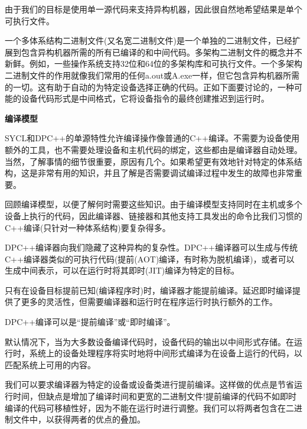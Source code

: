 由于我们的目标是使用单一源代码来支持异构机器，因此很自然地希望结果是单个可执行文件。\par

一个多体系结构二进制文件(又名宽二进制文件)是一个单独的二进制文件，已经扩展到包含异构机器所需的所有已编译的和中间代码。多架构二进制文件的概念并不新鲜。例如，一些操作系统支持32位和64位的多架构库和可执行文件。一个多架构二进制文件的作用就像我们常用的任何a.out或A.exe一样，但它包含异构机器所需的一切。这有助于自动的为特定设备选择正确的代码。正如下面要讨论的，一种可能的设备代码形式是中间格式，它将设备指令的最终创建推迟到运行时。\par

\hspace*{\fill} \par %
\textbf{编译模型}

SYCL和DPC++的单源特性允许编译操作像普通的C++编译。不需要为设备使用额外的工具，也不需要处理设备和主机代码的绑定，这些都由是编译器自动处理。当然，了解事情的细节很重要，原因有几个。如果希望更有效地针对特定的体系结构，这是非常有用的知识，并且了解是否需要调试编译过程中发生的故障也非常重要。\par

回顾编译模型，以便了解何时需要这些知识。由于编译模型支持同时在主机或多个设备上执行的代码，因此编译器、链接器和其他支持工具发出的命令比我们习惯的C++编译(只针对一种体系结构)要复杂得多。\par

DPC++编译器向我们隐藏了这种异构的复杂性。DPC++编译器可以生成与传统C++编译器类似的可执行代码(提前(AOT)编译，有时称为脱机编译)，或者可以生成中间表示，可以在运行时将其即时(JIT)编译为特定的目标。\par

只有在设备目标提前已知(编译程序时)时，编译器才能提前编译。延迟即时编译提供了更多的灵活性，但需要编译器和运行时在程序运行时执行额外的工作。\par

\begin{tcolorbox}[colback=red!5!white,colframe=red!75!black]
DPC++编译可以是“提前编译”或“即时编译”。
\end{tcolorbox}

默认情况下，当为大多数设备编译代码时，设备代码的输出以中间形式存储。在运行时，系统上的设备处理程序将实时地将中间形式编译为在设备上运行的代码，以匹配系统上可用的内容。\par

我们可以要求编译器为特定的设备或设备类进行提前编译。这样做的优点是节省运行时间，但缺点是增加了编译时间和更宽的二进制文件!提前编译的代码不如即时编译的代码可移植性好，因为不能在运行时进行调整。我们可以将两者包含在二进制文件中，以获得两者的优点的叠加。\par

